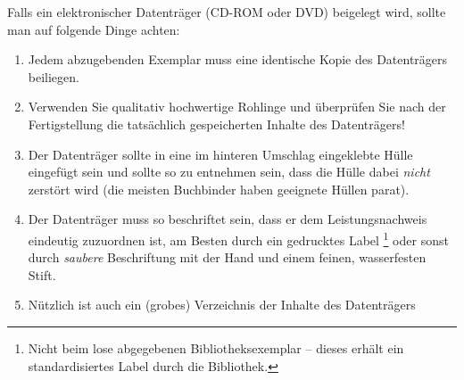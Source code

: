 Falls ein elektronischer Datenträger (CD-ROM oder DVD) beigelegt
wird, sollte man auf folgende Dinge achten:
%
\begin{enumerate}
\item Jedem abzugebenden Exemplar muss eine identische Kopie des
Datenträgers beiliegen. %
\item Verwenden Sie qualitativ hochwertige Rohlinge und überprüfen
Sie nach der Fertigstellung die tatsächlich gespeicherten Inhalte
des Datenträgers! %
\item Der Datenträger sollte in eine im hinteren Umschlag
eingeklebte Hülle eingefügt sein und sollte so zu entnehmen sein,
dass die Hülle dabei \emph{nicht} zerstört wird (die
meisten Buchbinder haben geeignete Hüllen parat). %
\item Der Datenträger muss so beschriftet sein, dass er dem
Leistungsnachweis eindeutig zuzuordnen ist, am Besten durch ein
gedrucktes Label%
\footnote{Nicht beim lose abgegebenen Bibliotheksexemplar --
dieses erhält ein standardisiertes Label durch die Bibliothek.} %
oder sonst durch \emph{saubere}
Beschriftung mit
der Hand und einem feinen, wasserfesten Stift. %
\item Nützlich ist auch ein (grobes) Verzeichnis der Inhalte des
Datenträgers
\end{enumerate}
